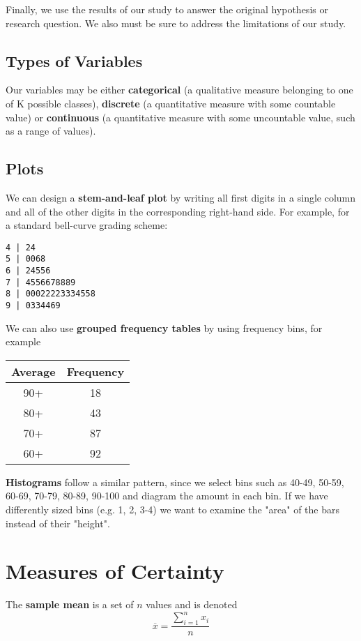 \documentclass[12pt]{article}
\begin{document}
Finally, we use the results of our study to answer the original hypothesis or research question. We also must be sure to address the limitations of our study.

\subsection*{Types of Variables}
Our variables may be either {\bf categorical} (a qualitative measure belonging to one of K possible classes), {\bf discrete} (a quantitative measure with some countable value) or {\bf continuous} (a quantitative measure with some uncountable value, such as a range of values).

\subsection*{Plots}
We can design a {\bf stem-and-leaf plot} by writing all first digits in a single column and all of the other digits in the corresponding right-hand side. For example, for a standard bell-curve grading scheme:

\begin{verbatim}
4 | 24
5 | 0068
6 | 24556
7 | 4556678889
8 | 00022223334558
9 | 0334469
\end{verbatim}

We can also use {\bf grouped frequency tables} by using frequency bins, for example

\begin{table}[ht]
\centering
\begin{tabular}{|c|c|}
  \hline
  Average & Frequency \\ \hline
  90+ & 18 \\
  80+ & 43 \\
  70+ & 87 \\
  60+ & 92 \\ \hline
  \end{tabular}
\end{table}

{\bf Histograms} follow a similar pattern, since we select bins such as 40-49, 50-59, 60-69, 70-79, 80-89, 90-100 and diagram the amount in each bin. If we have differently sized bins (e.g. 1, 2, 3-4) we want to examine the "area" of the bars instead of their "height".

\section*{Measures of Certainty}
The {\bf sample mean} is a set of $n$ values and is denoted \[ \overline{x} = \frac{\displaystyle\sum_{i=1}^n x_i}{n} \]
\end{document}
